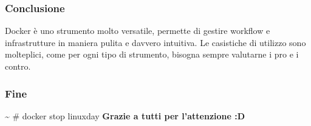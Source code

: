 \documentclass{beamer}
\begin{document}

\begin{frame}
    \frametitle{VM vs Docker: layers}
    \begin{center}
        \texttt{[image: \{vmvsdocker.png]}}
    \end{center}
\end{frame}


\begin{frame}
    \frametitle{Conclusione}
    Docker \`e uno strumento molto versatile, permette di gestire workflow e infrastrutture in maniera pulita e davvero intuitiva. Le casistiche di utilizzo
    sono molteplici, come per ogni tipo di strumento, bisogna sempre valutarne i pro e i contro.
\end{frame}


\begin{frame}
    \frametitle{Fine}
    \begin{center}
        \~{} \#{} docker stop linuxday 
        \newline
        \newline
        \textbf{Grazie a tutti per l'attenzione :D}
    \end{center}
\end{frame}

\end{document}
